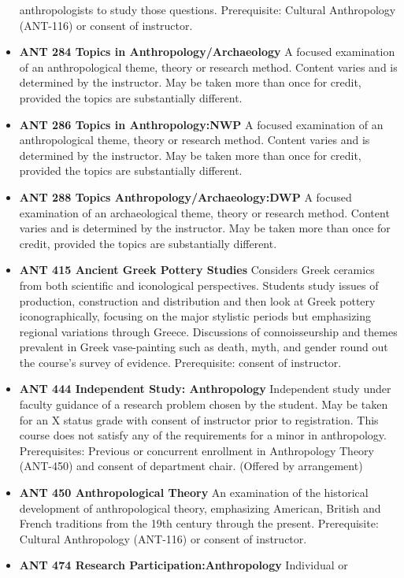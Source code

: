 \documentclass[
  letterpaper,
]{scrbook}
\begin{document}
\begin{itemize}
  anthropologists to study those questions. Prerequisite: Cultural
  Anthropology (ANT-116) or consent of instructor.
\item
  \textbf{ANT 284 Topics in Anthropology/Archaeology} A focused
  examination of an anthropological theme, theory or research method.
  Content varies and is determined by the instructor. May be taken more
  than once for credit, provided the topics are substantially different.
\item
  \textbf{ANT 286 Topics in Anthropology:NWP} A focused examination of
  an anthropological theme, theory or research method. Content varies
  and is determined by the instructor. May be taken more than once for
  credit, provided the topics are substantially different.
\item
  \textbf{ANT 288 Topics Anthropology/Archaeology:DWP} A focused
  examination of an archaeological theme, theory or research method.
  Content varies and is determined by the instructor. May be taken more
  than once for credit, provided the topics are substantially different.
\item
  \textbf{ANT 415 Ancient Greek Pottery Studies} Considers Greek
  ceramics from both scientific and iconological perspectives. Students
  study issues of production, construction and distribution and then
  look at Greek pottery iconographically, focusing on the major
  stylistic periods but emphasizing regional variations through Greece.
  Discussions of connoisseurship and themes prevalent in Greek
  vase-painting such as death, myth, and gender round out the course's
  survey of evidence. Prerequisite: consent of instructor.
\item
  \textbf{ANT 444 Independent Study: Anthropology} Independent study
  under faculty guidance of a research problem chosen by the student.
  May be taken for an X status grade with consent of instructor prior to
  registration. This course does not satisfy any of the requirements for
  a minor in anthropology. Prerequisites: Previous or concurrent
  enrollment in Anthropology Theory (ANT-450) and consent of department
  chair. (Offered by arrangement)
\item
  \textbf{ANT 450 Anthropological Theory} An examination of the
  historical development of anthropological theory, emphasizing
  American, British and French traditions from the 19th century through
  the present. Prerequisite: Cultural Anthropology (ANT-116) or consent
  of instructor.
\item
  \textbf{ANT 474 Research Participation:Anthropology} Individual or

\end{itemize}
\end{document}
